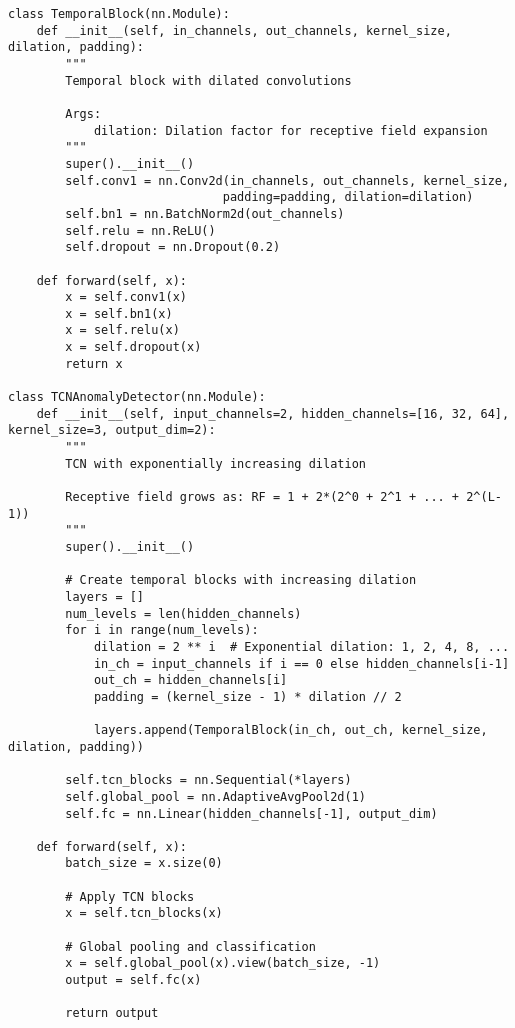 \documentclass[12pt,a4paper]{article}
\begin{document}
\begin{lstlisting}[caption={TCN Anomaly Detector - Parallel Temporal Processing}]
class TemporalBlock(nn.Module):
    def __init__(self, in_channels, out_channels, kernel_size, dilation, padding):
        """
        Temporal block with dilated convolutions
        
        Args:
            dilation: Dilation factor for receptive field expansion
        """
        super().__init__()
        self.conv1 = nn.Conv2d(in_channels, out_channels, kernel_size, 
                              padding=padding, dilation=dilation)
        self.bn1 = nn.BatchNorm2d(out_channels)
        self.relu = nn.ReLU()
        self.dropout = nn.Dropout(0.2)
    
    def forward(self, x):
        x = self.conv1(x)
        x = self.bn1(x)
        x = self.relu(x)
        x = self.dropout(x)
        return x

class TCNAnomalyDetector(nn.Module):
    def __init__(self, input_channels=2, hidden_channels=[16, 32, 64], kernel_size=3, output_dim=2):
        """
        TCN with exponentially increasing dilation
        
        Receptive field grows as: RF = 1 + 2*(2^0 + 2^1 + ... + 2^(L-1))
        """
        super().__init__()
        
        # Create temporal blocks with increasing dilation
        layers = []
        num_levels = len(hidden_channels)
        for i in range(num_levels):
            dilation = 2 ** i  # Exponential dilation: 1, 2, 4, 8, ...
            in_ch = input_channels if i == 0 else hidden_channels[i-1]
            out_ch = hidden_channels[i]
            padding = (kernel_size - 1) * dilation // 2
            
            layers.append(TemporalBlock(in_ch, out_ch, kernel_size, dilation, padding))
        
        self.tcn_blocks = nn.Sequential(*layers)
        self.global_pool = nn.AdaptiveAvgPool2d(1)
        self.fc = nn.Linear(hidden_channels[-1], output_dim)
    
    def forward(self, x):
        batch_size = x.size(0)
        
        # Apply TCN blocks
        x = self.tcn_blocks(x)
        
        # Global pooling and classification
        x = self.global_pool(x).view(batch_size, -1)
        output = self.fc(x)
        
        return output
\end{lstlisting}
\end{document}
